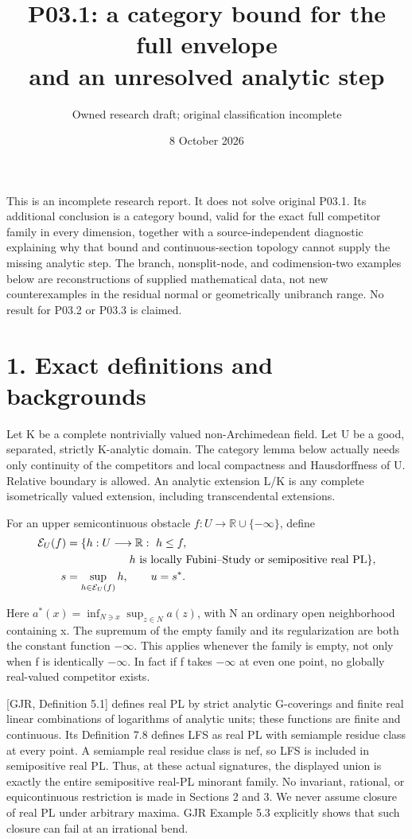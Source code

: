 \documentclass[11pt,a4paper]{article}
\title{P03.1: a category bound for the full envelope\\and an unresolved analytic step}
\author{Owned research draft; original classification incomplete}
\date{8 October 2026}
\begin{document}
\maketitle

This is an incomplete research report. It does not solve original P03.1. Its additional conclusion is a category bound, valid for the exact full competitor family in every dimension, together with a source-independent diagnostic explaining why that bound and continuous-section topology cannot supply the missing analytic step. The branch, nonsplit-node, and codimension-two examples below are reconstructions of supplied mathematical data, not new counterexamples in the residual normal or geometrically unibranch range. No result for P03.2 or P03.3 is claimed.

\section*{1. Exact definitions and backgrounds}

Let K be a complete nontrivially valued non-Archimedean field. Let U be a good, separated, strictly K-analytic domain. The category lemma below actually needs only continuity of the competitors and local compactness and Hausdorffness of U. Relative boundary is allowed. An analytic extension L/K is any complete isometrically valued extension, including transcendental extensions.

For an upper semicontinuous obstacle \(f:U\longrightarrow\mathbb R\cup\{-\infty\}\), define
\[
\begin{aligned}
\mathcal E_U(f)&=\{h:U\longrightarrow\mathbb R:\ h\leq f,\\
&\hspace{20mm}h\text{ is locally Fubini--Study or semipositive real PL}\},\\
s&=\sup_{h\in\mathcal E_U(f)}h,\qquad u=s^*.
\end{aligned}
\]

Here \(a^*(x)=\inf_{N\ni x}\sup_{z\in N}a(z)\), with N an ordinary open neighborhood containing x. The supremum of the empty family and its regularization are both the constant function \(-\infty\). This applies whenever the family is empty, not only when f is identically \(-\infty\). In fact if f takes \(-\infty\) at even one point, no globally real-valued competitor exists.

[GJR, Definition 5.1] defines real PL by strict analytic G-coverings and finite real linear combinations of logarithms of analytic units; these functions are finite and continuous. Its Definition 7.8 defines LFS as real PL with semiample residue class at every point. A semiample real residue class is nef, so LFS is included in semipositive real PL. Thus, at these actual signatures, the displayed union is exactly the entire semipositive real-PL minorant family. No invariant, rational, or equicontinuous restriction is made in Sections 2 and 3. We never assume closure of real PL under arbitrary maxima. GJR Example 5.3 explicitly shows that such closure can fail at an irrational bend.
\end{document}
